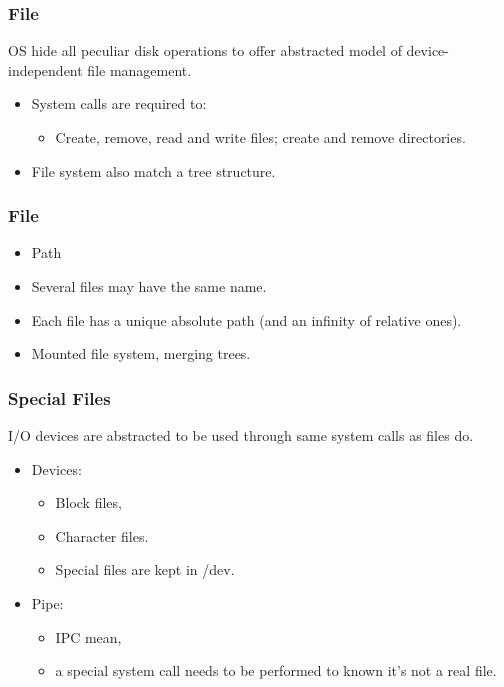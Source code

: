   \begin{frame}
    \frametitle{File}
    OS hide all peculiar disk operations to offer abstracted model of device-independent file management.
      \begin{itemize}
        \item System calls are required to:
        \begin{itemize}
          \item Create, remove, read and write files; create and remove directories.
        \end{itemize}
        \item File system also match a tree structure.
      \end{itemize}
  \end{frame}
  \begin{frame}
    \frametitle{File}
      \begin{itemize}
        \item Path
        \item Several files may have the same name.
        \item Each file has a unique absolute path (and an infinity of relative ones).
        \item Mounted file system, merging trees.
      \end{itemize}
  \end{frame}
  \begin{frame}
    \frametitle{Special Files}
      I/O devices are abstracted to be used through same system calls as files do.
      \begin{itemize}
        \item Devices:
          \begin{itemize}
            \item Block files,
            \item Character files.
            \item Special files are kept in /dev.
          \end{itemize}
        \item Pipe:
          \begin{itemize}
            \item IPC mean,
            \item a special system call needs to be performed to known it's not a real file.
          \end{itemize}
      \end{itemize}
  \end{frame}

